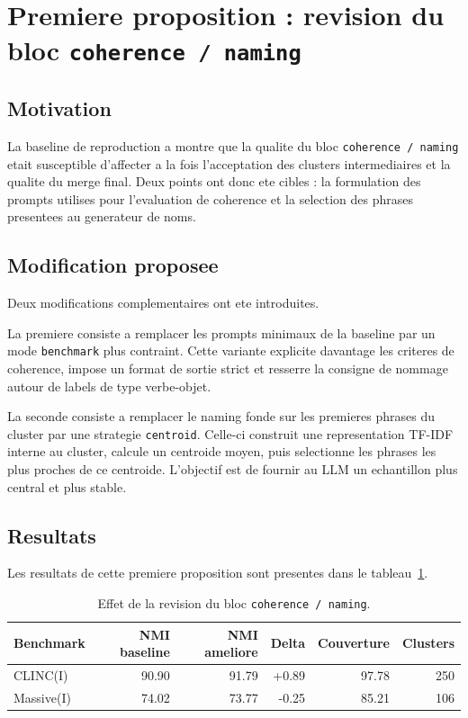 \section{Premiere proposition : revision du bloc \texttt{coherence / naming}}

\subsection{Motivation}

La baseline de reproduction a montre que la qualite du bloc
\texttt{coherence / naming} etait susceptible d'affecter a la fois
l'acceptation des clusters intermediaires et la qualite du merge final. Deux
points ont donc ete cibles : la formulation des prompts utilises pour
l'evaluation de coherence et la selection des phrases presentees au generateur
de noms.

\subsection{Modification proposee}

Deux modifications complementaires ont ete introduites.

La premiere consiste a remplacer les prompts minimaux de la baseline par un
mode \texttt{benchmark} plus contraint. Cette variante explicite davantage les
criteres de coherence, impose un format de sortie strict et resserre la
consigne de nommage autour de labels de type verbe-objet.

La seconde consiste a remplacer le naming fonde sur les premieres phrases du
cluster par une strategie \texttt{centroid}. Celle-ci construit une
representation TF-IDF interne au cluster, calcule un centroide moyen, puis
selectionne les phrases les plus proches de ce centroide. L'objectif est de
fournir au LLM un echantillon plus central et plus stable.

\subsection{Resultats}

Les resultats de cette premiere proposition sont presentes dans le
tableau~\ref{tab:first-improvement-results}.

\begin{table}[h]
  \centering
  \small
  \begin{tabular}{lrrrrr}
    \toprule
    Benchmark & NMI baseline & NMI ameliore & Delta & Couverture & Clusters \\
    \midrule
    CLINC(I) & 90.90 & 91.79 & +0.89 & 97.78 & 250 \\
    Massive(I) & 74.02 & 73.77 & -0.25 & 85.21 & 106 \\
    \bottomrule
  \end{tabular}
  \caption{Effet de la revision du bloc \texttt{coherence / naming}.}
  \label{tab:first-improvement-results}
\end{table}

